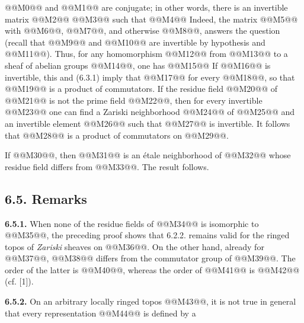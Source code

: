 
@@M0@@ and @@M1@@ are conjugate; in other words, there is an invertible matrix @@M2@@ @@M3@@ such that
@@M4@@
Indeed, the matrix @@M5@@ with @@M6@@, @@M7@@, and otherwise @@M8@@, answers the question (recall that @@M9@@ and @@M10@@ are invertible by hypothesis and @@M11@@). Thus, for any homomorphism @@M12@@ from @@M13@@ to a sheaf of abelian groups @@M14@@, one has
@@M15@@
If @@M16@@ is invertible, this and (6.3.1) imply that @@M17@@ for every @@M18@@, so that @@M19@@ is a product of commutators. If the residue field @@M20@@ of @@M21@@ is not the prime field @@M22@@, then for every invertible @@M23@@ one can find a Zariski neighborhood @@M24@@ of @@M25@@ and an invertible element @@M26@@ such that @@M27@@ is invertible. It follows that @@M28@@ is a product of commutators on @@M29@@.

If @@M30@@, then @@M31@@ is an étale neighborhood of @@M32@@ whose residue field differs from @@M33@@. The result follows.

\subsection*{6.5. Remarks}
\textbf{6.5.1.} When none of the residue fields of @@M34@@ is isomorphic to @@M35@@, the preceding proof shows that 6.2.2. remains valid for the ringed topos of \emph{Zariski} sheaves on @@M36@@. On the other hand, already for @@M37@@, @@M38@@ differs from the commutator group of @@M39@@. The order of the latter is @@M40@@, whereas the order of @@M41@@ is @@M42@@ (cf. [1]).

\textbf{6.5.2.} On an arbitrary locally ringed topos @@M43@@, it is not true in general that every representation @@M44@@ is defined by a
